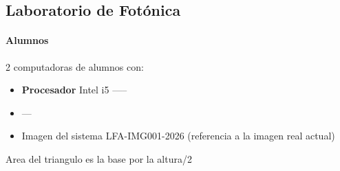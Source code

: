 {\subsection{Laboratorio de Fotónica}

\paragraph{Alumnos} 2 computadoras de alumnos con:
\begin{itemize}
    \item \textbf{Procesador} Intel i5 -----
    \item ---
    \item Imagen del sistema LFA-IMG001-2026 (referencia a la imagen real actual)
\end{itemize}

Area del triangulo es la base por la altura/2



}